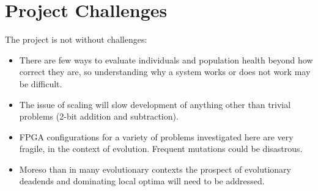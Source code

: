 \section{Project Challenges}
The project is not without challenges:
\begin{itemize}
	\item There are few ways to evaluate individuals and population health beyond how
		correct they are, so understanding why a system works or does not work may
		be difficult.
	\item The issue of scaling will slow development of anything other than
		trivial problems (2-bit addition and subtraction).
	\item FPGA configurations for a variety of problems investigated here are very fragile, in the
		context of evolution. Frequent mutations could be disastrous.
	\item Moreso than in many evolutionary contexts the prospect of evolutionary deadends
		and dominating local optima will need to be addressed.
\end{itemize}
